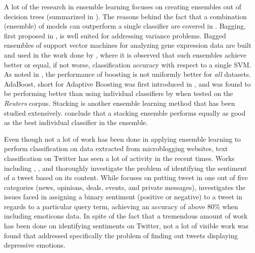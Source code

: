 A lot of the research in ensemble learning focuses on creating ensembles out of decision trees (summarized in \cite{safavian1991survey}). The reasons behind the fact that a combination (ensemble) of models can outperform a single classifier are covered in \cite{valentini2002ensembles}. Bagging, first proposed in \cite{breiman1996bagging}, is well suited for addressing variance problems. Bagged ensembles of support vector machines for analyzing gene expression data are built and used in the work done by \cite{valentini2003bagged}, where it is observed that such ensembles achieve better or equal, if not worse, classification accuracy with respect to a single SVM. As noted in \cite{bauer1999empirical}, the performance of boosting is not uniformly better for \emph{all} datasets. AdaBoost, short for Adaptive Boosting was first introduced in \cite{freund1999short}, and was found to be performing better than using individual classifiers by \cite{bloehdorn2004text} when tested on the \emph{Reuters} \cite{reuters} corpus. Stacking \cite{wolpert1992stacked} is another ensemble learning method that has been studied extensively. \cite{dvzeroski2004combining} conclude that a stacking ensemble performs equally as good as the best individual classifier in the ensemble.

Even though not a lot of work has been done in applying ensemble learning to perform classification on data extracted from microblogging websites, text classification on Twitter has seen a lot of activity in the recent times. Works including \cite{sriram2010short}, \cite{go2009twitter}, and \cite{jiang2011target} thoroughly investigate the problem of identifying the sentiment of a tweet based on its content. While \cite{sriram2010short} focuses on putting tweet in one out of five categories (news, opinions, deals, events, and private messages), \cite{go2009twitter} investigates the issues faced in assigning a binary sentiment (positive or negative) to a tweet in regards to a particular query term, achieving an accuracy of above 80\% when including emoticons data. In spite of the fact that a tremendous amount of work has been done on identifying sentiments on Twitter, not a lot of visible work was found that addressed specifically the problem of finding out tweets displaying depressive emotions.

